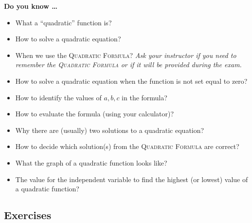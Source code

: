 


\noindent \textbf{Do you know \ldots}

\begin{itemize}
\item What a ``quadratic'' function is? 
\item How to solve a quadratic equation? 
\item When we use the \textsc{Quadratic Formula}?   \emph{Ask your instructor if you need to remember the \textsc{Quadratic Formula} or if it will be provided during the exam.}
\item How to solve a quadratic equation when the function is not set equal to zero? 
\item How to identify the values of $a, b, c$ in the formula? 
\item How to evaluate the formula (using your calculator)?   \item Why there are (usually) two solutions to a quadratic equation? 
\item How to decide which solution(s) from the \textsc{Quadratic Formula} are correct? 
\item What the graph of a quadratic function looks like? 
\item The value for the independent variable to find  the highest (or lowest) value of a quadratic function? 
 
\end{itemize}

\subsection*{Exercises}

